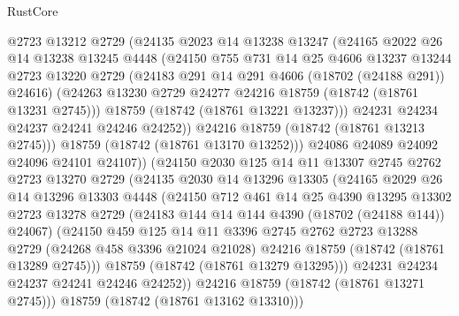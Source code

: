 \begin{lexlean}{RustCore}
\begin{coremodule}
              @2723
              @13212
              @2729
              (@24135
                @2023
                @14
                @13238
                @13247
                (@24165
                  @2022
                  @26
                  @14
                  @13238
                  @13245
                  @4448
                  (@24150
                    @755
                    @731
                    @14
                    @25
                    @4606
                    @13237
                    @13244
                    @2723
                    @13220
                    @2729
                    (@24183 @291 @14 @291 @4606 (@18702 (@24188 @291)) @24616)
                    (@24263 @13230 @2729 @24277 @24216 @18759 (@18742 (@18761 @13231 @2745)))
                    @18759
                    (@18742 (@18761 @13221 @13237)))
                  @24231
                  @24234
                  @24237
                  @24241
                  @24246
                  @24252))
              @24216
              @18759
              (@18742 (@18761 @13213 @2745)))
            @18759
            (@18742 (@18761 @13170 @13252)))
          @24086
          @24089
          @24092
          @24096
          @24101
          @24107))
      (@24150
        @2030
        @125
        @14
        @11
        @13307
        @2745
        @2762
        @2723
        @13270
        @2729
        (@24135
          @2030
          @14
          @13296
          @13305
          (@24165
            @2029
            @26
            @14
            @13296
            @13303
            @4448
            (@24150
              @712
              @461
              @14
              @25
              @4390
              @13295
              @13302
              @2723
              @13278
              @2729
              (@24183 @144 @14 @144 @4390 (@18702 (@24188 @144)) @24067)
              (@24150
                @459
                @125
                @14
                @11
                @3396
                @2745
                @2762
                @2723
                @13288
                @2729
                (@24268 @458 @3396 @21024 @21028)
                @24216
                @18759
                (@18742 (@18761 @13289 @2745)))
              @18759
              (@18742 (@18761 @13279 @13295)))
            @24231
            @24234
            @24237
            @24241
            @24246
            @24252))
        @24216
        @18759
        (@18742 (@18761 @13271 @2745)))
      @18759
      (@18742 (@18761 @13162 @13310)))

\end{coremodule}
\end{lexlean}

